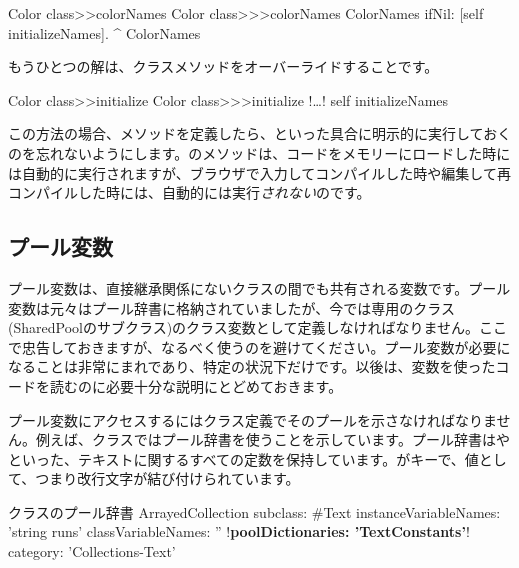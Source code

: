 \documentclass[a4paper,10pt,twoside]{book}
\begin{document}
\begin{method}[colorclasscolornames]{Color class>>colorNames}
Color class>>>colorNames	
	ColorNames ifNil: [self initializeNames].
	^ ColorNames
\end{method}	

もうひとつの解は、クラスメソッドをオーバーライドすることです。

\begin{method}[colorclassinit]{Color class>>initialize}
Color class>>>initialize	
	!\ldots!
	self initializeNames
\end{method}	

\noindent
この方法の場合、メソッドを定義したら、といった具合に明示的に実行しておくのを忘れないようにします。のメソッドは、コードをメモリーにロードした時には自動的に実行されますが、ブラウザで入力してコンパイルした時や編集して再コンパイルした時には、自動的には実行\emph{されない}のです。

\subsection{プール変数}
プール変数は、直接継承関係にないクラスの間でも共有される変数です。プール変数は元々はプール辞書に格納されていましたが、今では専用のクラス(SharedPoolのサブクラス)のクラス変数として定義しなければなりません。ここで忠告しておきますが、なるべく使うのを避けてください。プール変数が必要になることは非常にまれであり、特定の状況下だけです。以後は、変数を使ったコードを読むのに必要十分な説明にとどめておきます。

プール変数にアクセスするにはクラス定義でそのプールを示さなければなりません。例えば、クラスではプール辞書を使うことを示しています。プール辞書はやといった、テキストに関するすべての定数を保持しています。がキーで、値として、つまり改行文字が結び付けられています。

\begin{classdef}[textpooldict]{クラスのプール辞書}
ArrayedCollection subclass: #Text
        instanceVariableNames: 'string runs' 	
        classVariableNames: '' 	
        !\textbf{poolDictionaries: 'TextConstants'}!
        category: 'Collections-Text'
\end{classdef}
   
\end{document}
